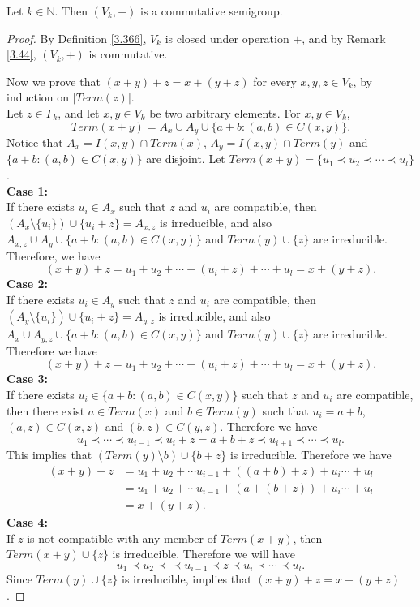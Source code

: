 \documentclass[10pt,a4paper]{amsart}
\begin{document}
\begin{theorem}{\label{3.66}}
	Let $k\in\mathbb{N}$. Then $(V_k,+)$ is a commutative semigroup.
\end{theorem}

\begin{proof}
	By Definition \ref{3.366}, $V_k$ is closed under operation $+$, and by Remark \ref{3.44}, $(V_k,+)$ is commutative.
	
	Now we prove that $(x+y)+z=x+(y+z)$ for every $x,y,z\in V_k$, by induction on $|Term(z)|$.\\
	Let $z\in \Gamma_k$, and let $x,y\in V_k$ be two arbitrary elements. For $x,y\in V_k$, 
	\[
	Term(x+y)=A_x\cup A_y\cup\{a+b:(a,b)\in C(x,y)\}.
	\]
	Notice that $A_x=I(x,y)\cap Term(x)$, $A_y=I(x,y)\cap Term(y)$ and $\{a+b:(a,b)\in C(x,y)\}$ are disjoint. Let $Term(x+y)=\{u_1\prec u_2\prec\cdots\prec u_l\}$.\\
	{\bf{ Case 1:}}\\
	If there exists $u_i\in A_x$ such that $z$ and $u_i$ are compatible, then $(A_x\setminus\{u_i\})\cup\{u_i+z\}=A_{x,z}$ is irreducible, and also  $A_{x,z}\cup A_y\cup\{a+b:(a,b)\in C(x,y)\}$  and $Term(y)\cup\{z\}$  are irreducible. Therefore, we have 
	\[
	(x+y)+z=u_1+u_2+\cdots+(u_i+z)+\cdots+u_l=x+(y+z).
	\]
	{\bf{ Case 2:}}\\	
	If there exists $u_i\in A_y$ such that $z$ and $u_i$ are compatible, then $(A_y\setminus\{u_i\})\cup\{u_i+z\}=A_{y,z}$ is irreducible, and also  $A_{x}\cup A_{y,z}\cup\{a+b:(a,b)\in C(x,y)\}$  and $Term(y)\cup\{z\}$  are irreducible. Therefore we have 
	\[
	(x+y)+z=u_1+u_2+\cdots+(u_i+z)+\cdots+u_l=x+(y+z).
	\]
	{\bf{ Case 3:}}\\	
	If there exists $u_i\in \{a+b:(a,b)\in C(x,y)\}$ such that $z$ and $u_i$ are compatible, then there exist $a\in Term(x)$ and $b\in Term(y)$ such that $u_i=a+b$, $(a,z)\in C(x,z)$ and $(b,z)\in C(y,z)$.  Therefore we have 
	\[
	u_1\prec\cdots\prec u_{i-1}\prec u_i+z=a+b+z\prec u_{i+1}\prec \cdots\prec u_l.
	\]
	This implies that $(Term(y)\setminus{b})\cup\{b+z\}$ is irreducible. Therefore we have 
	\begin{align*}
	(x+y)+z&=u_1+u_2+\cdots u_{i-1}+((a+b)+z)+u_{i}\cdots+u_l\\
	&=u_1+u_2+\cdots u_{i-1}+(a+(b+z))+u_{i}\cdots+u_l\\
	&=x+(y+z).
	\end{align*}	
	{\bf{ Case 4:}}\\	
	If $z$ is not compatible with any member of $Term(x+y)$, then $Term(x+y)\cup\{z\}$ is irreducible. Therefore we will have
	\[
	u_1\prec u_2\prec\prec u_{i-1}\prec z\prec u_i\prec\cdots\prec u_l.
	\]
	Since $Term(y)\cup\{z\}$ is irreducible, implies that $(x+y)+z=x+(y+z)$.
	

\end{proof}
\end{document}
